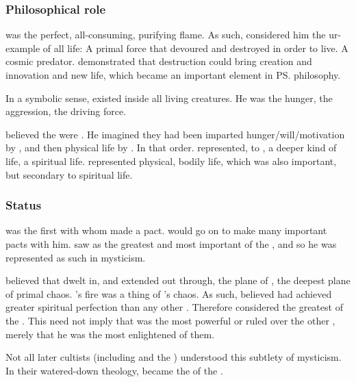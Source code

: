 \subsubsection{Philosophical role}
\RuinSatha was the perfect, all-consuming, purifying flame. 
As such,  considered him the ur-example of all life: 
A primal force that devoured and destroyed in order to live. 
A cosmic predator. 
\RuinSatha demonstrated that destruction could bring creation and innovation and new life, which became an important element in \ps{\Sethicus} philosophy. 

In a symbolic sense, \RuinSatha existed inside all living creatures.
He was the hunger, the aggression, the driving force. 

\Sethicus believed the \ophidians were .
He imagined they had been imparted hunger/will/motivation by \RuinSatha, and then physical life by \KhothSell. 
In that order. 
\RuinSatha represented, to \Sethicus, a deeper kind of life, a spiritual life. 
\KhothSell represented physical, bodily life, which was also important, but secondary to spiritual life. 





\subsubsection{Status}
\RuinSatha was the first \xs with whom \Sethicus made a pact. 
\Sethicus would go on to make many important pacts with him. 
\Sethicus saw \RuinSatha as the greatest and most important of the \xs, and so he was represented as such in \draconian mysticism. 

\Sethicus believed that \RuinSatha dwelt in, and extended out through, the plane of \DaathKurZulNathla, the deepest plane of primal chaos. 
\RuinSatha's fire was a thing of \DaathKurZulNathla's chaos.
As such, \Sethicus believed \RuinSatha had achieved greater spiritual perfection than any other \xs. 
Therefore \Sethicus considered \RuinSatha the greatest of the \xss.
This need not imply that \RuinSatha was the most powerful or ruled over the other \xss, merely that he was the most enlightened of them. 

Not all later cultists (including \dragons and the ) understood this subtlety of \Sethican mysticism. 
In their watered-down theology, \RuinSatha became the  of the \xss.

